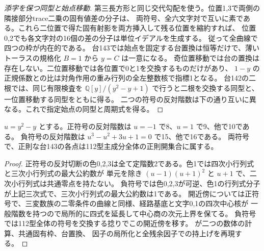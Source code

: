 \begin{proof}[添字を保つ同型と始点移動]
第三長方形と同じ交代勾配を使う。位置1,3で両側の隣接部分trace二乗の固有値差の分子は、
両符号、全六文字対で互いに素である。これら二位置で得た固有射影を両方挿入して残る位置を縮約すれば、
位置0,2でも各文字対の16個の差の分子は単位イデアルを生成する。
従って全曲線で四つの枠が内在的である。
台143では始点を固定する台置換は恒等だけで、薄いトーラスの規格化 $B=1$ から $y=C$ は一意になる。
奇位置移動では台の置換は存在しない。二位置移動では各位置で0と1を交換するものだけがあり、
$1-y$ の正規係数との比は対角作用の重み行列の全左整数核で指標1となる。
台142の二根では、同じ有限検査を $\mathbb Q[y]/(y^2-y+1)$ で行うと二根を交換する同型と、一位置移動する同型をともに得る。
二つの符号の反対階数は下の通り互いに異なる。これで指定始点の同型と周期式を得る。
\end{proof}

\begin{corollary}
$u=y^2-y$ とする。正符号の反対階数は $u=-1$ で8、$u=1$ で9、他で10である。
負符号の反対階数は $u^3-u^2+3u+1=0$ で15、他で16である。
両符号で、正則な台143の各点は112型主成分全体の正則開集合に属する。
\end{corollary}
\begin{proof}
正符号の反対切断の色0,2,3は全て定階数2である。色1では四次小行列式と三次小行列式の最大公約数が
単元を除き $(u-1)(u+1)^2$ と $u+1$ で、二次小行列式は共通零点を持たない。
負符号では色0,2,3が可逆、色1の行列式分子が上記三次式で、三次小行列式の最大公約数は1である。
開近傍については正符号で、三変数族の二零条件の曲線と同様、経路基底と文字0,1の四次中心核が
一般階数を持つので局所的に四式を延長して中心商の次元上界を保てる。
負符号では112型全体の符号を交換する捻りでこの開近傍を移す。
 が二つの数体の計算、共通固有枠、台置換、
因子の局所化と全残余因子での持上げを再現する。
\end{proof}
